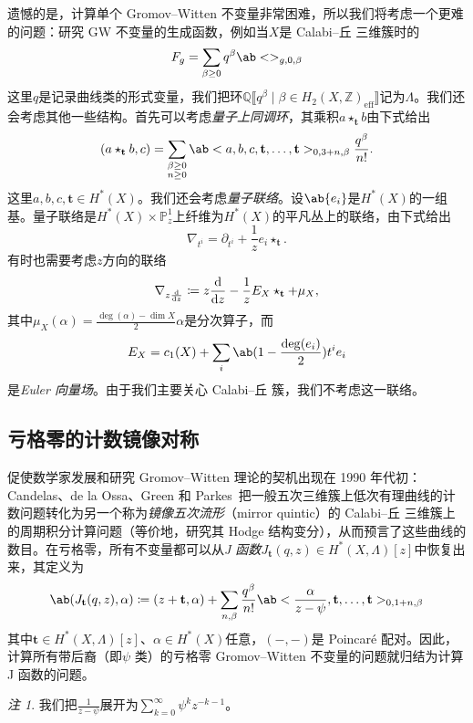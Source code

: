 \documentclass{amsart}
\theoremstyle{definition}
\theoremstyle{remark}
\newtheorem{rmk}[thm]{注}
\theoremstyle{plain}
\theoremstyle{definition}
\theoremstyle{remark}
\newcommand{\Z}{\mathbb{Z}}
\newcommand{\Q}{\mathbb{Q}}
\renewcommand{\P}{\mathbb{P}}
\newcommand{\mbf}[1]{\mathbf{#1}}
\newcommand{\mr}[1]{\mathrm{#1}}
\newcommand{\1}{\mathbf{1}}
\newcommand{\2}{\mathbf{2}}
\newcommand{\3}{\mathbf{3}}
\newcommand{\ps}[1]{\llbracket #1 \rrbracket}
\begin{document}
遗憾的是，计算单个 Gromov--Witten 不变量非常困难，所以我们将考虑一个更难的问题：研究 GW 不变量的生成函数，例如当\(X\)是 Calabi--丘 三维簇时的
\[ F_g = \sum_{\beta \geq 0} q^{\beta} \ab<>_{g,0,\beta} \]
这里\(q\)是记录曲线类的形式变量，我们把环\(\Q\ps{q^{\beta} \mid \beta \in H_2(X, \Z)_{\mr{eff}}}\)记为\(\Lambda\)。我们还会考虑其他一些结构。首先可以考虑\textit{量子上同调环}，其乘积\(a \star_{\mbf{t}} b\)由下式给出
\[
    (a \star_{\mbf{t}} b, c) = \sum_{\substack{\beta \geq 0 \\ n \geq 0}} \ab<a,b,c, \mbf{t}, \ldots, \mbf{t}>_{0,3+n,\beta} \frac{q^{\beta}}{n!}.
\]
这里\(a,b,c, \mbf{t} \in H^*(X)\)。我们还会考虑\textit{量子联络}。设\(\ab\{ e_i \}\)是\(H^*(X)\)的一组基。量子联络是\(H^*(X) \times \P^1_z\)上纤维为\(H^*(X)\)的平凡丛上的联络，由下式给出
\[ \nabla_{t^i} = \partial_{t^i} + \frac{1}{z} e_i \star_{\mbf{t}}. \]
有时也需要考虑\(z\)方向的联络
\[ \nabla_{z \odv{}{z}} \coloneqq z \odv{}{z} - \frac{1}{z} E_X \star_{\mbf{t}} + \mu_X, \]
其中\(\mu_X(\alpha) = \frac{\deg(\alpha) - \dim X}{2} \alpha\)是分次算子，而
\[ E_X = c_1(X) + \sum_i \ab(1 - \frac{\deg(e_i)}{2})t^i e_i \]
是\textit{Euler 向量场}。由于我们主要关心 Calabi--丘 簇，我们不考虑这一联络。

\subsection{亏格零的计数镜像对称}%
\label{sub:Enumerative mirror symmetry in genus zero}

促使数学家发展和研究 Gromov--Witten 理论的契机出现在 1990 年代初：Candelas、de la Ossa、Green 和 Parkes~\cite{CandelasEtAl1991}把一般五次三维簇上低次有理曲线的计数问题转化为另一个称为\textit{镜像五次流形}（mirror quintic）的 Calabi--丘 三维簇上的周期积分计算问题（等价地，研究其 Hodge 结构变分），从而预言了这些曲线的数目。在亏格零，所有不变量都可以从\textit{J 函数}\(J_{\mbf{t}}(q,z) \in H^*(X, \Lambda)[z]\)中恢复出来，其定义为
\[ \ab( J_{\mbf{t}}(q, z), \alpha ) \coloneqq (z + \mbf{t}, \alpha) + \sum_{n, \beta} \frac{q^{\beta}}{n!} \ab< \frac{\alpha}{z-\psi}, \mbf{t}, \ldots, \mbf{t}>_{0,1+n, \beta} \]
其中\(\mbf{t} \in H^*(X, \Lambda)[z]\)、\(\alpha \in H^*(X)\)任意，\((-,-)\)是 Poincar\'e 配对。因此，计算所有带后裔（即\(\psi\) 类）的亏格零 Gromov--Witten 不变量的问题就归结为计算J 函数的问题。

\begin{rmk}
    我们把\(\frac{1}{z-\psi}\)展开为\(\sum_{k=0}^{\infty} \psi^k z^{-k-1}\)。
\end{rmk}
\end{document}

